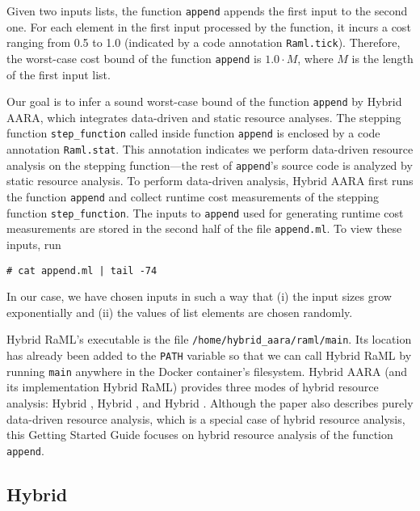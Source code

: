 Given two inputs lists, the function \texttt{append} appends the first input to
the second one.
%
For each element in the first input processed by the function, it incurs a cost
ranging from 0.5 to 1.0 (indicated by a code annotation \texttt{Raml.tick}).
%
Therefore, the worst-case cost bound of the function \texttt{append} is $1.0 \cdot M$, where $M$
is the length of the first input list.

Our goal is to infer a sound worst-case bound of the function \texttt{append} by
Hybrid AARA, which integrates data-driven and static resource analyses.
%
The stepping function \texttt{step\_function} called inside function
\texttt{append} is enclosed by a code annotation \texttt{Raml.stat}.
%
This annotation indicates we perform data-driven resource analysis on the
stepping function---the rest of \texttt{append}'s source code is analyzed by
static resource analysis.
%
To perform data-driven analysis, Hybrid AARA first runs the function
\texttt{append} and collect runtime cost measurements of the stepping function
\texttt{step\_function}.
%
The inputs to \texttt{append} used for generating runtime cost measurements are
stored in the second half of the file \texttt{append.ml}.
%
To view these inputs, run
\begin{verbatim}
# cat append.ml | tail -74
\end{verbatim}
%
In our case, we have chosen inputs in such a way that (i) the input sizes grow
exponentially and (ii) the values of list elements are chosen randomly.

Hybrid RaML's executable is the file \texttt{/home/hybrid\_aara/raml/main}.
%
Its location has already been added to the \texttt{PATH} variable so that we can
call Hybrid RaML by running \texttt{main} anywhere in the Docker container's
filesystem.
%
Hybrid AARA (and its implementation Hybrid RaML) provides three modes of hybrid
resource analysis: Hybrid \Opt{}, Hybrid \BayesWC{}, and Hybrid \BayesPC{}.
%
Although the paper also describes purely data-driven resource analysis, which is
a special case of hybrid resource analysis, this Getting Started Guide focuses
on hybrid resource analysis of the function \texttt{append}.

\subsection{Hybrid \Opt{}}

